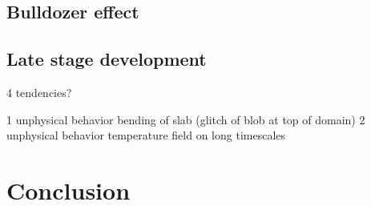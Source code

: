 \documentclass[12pt]{scrartcl}
\begin{document}
\subsection{Bulldozer effect}

\subsection{Late stage development}
4 tendencies?


1 unphysical behavior bending of slab (glitch of blob at top of domain)
2 unphysical behavior temperature field on long timescales



\section{Conclusion}

\nocite{vargas2013tearing}
\nocite{gerya2009introduction}




\newpage



\end{document}
